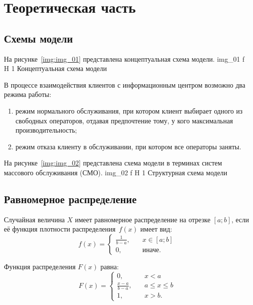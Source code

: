 \chapter{Теоретическая часть}

\section{Схемы модели}

На рисунке~\ref{img:img_01} представлена концептуальная схема модели.
	{img_01}
	{f}
	{H}
	{1\textwidth}
	{Концептуальная схема модели}

В процессе взаимодействия клиентов с информационным центром возможно два режима работы:
\begin{enumerate}
	\item режим нормального обслуживания, при котором клиент выбирает одного из свободных операторов, отдавая предпочтение тому, у кого максимальная производительность;
	\item режим отказа клиенту в обслуживании, при котором все операторы заняты.
\end{enumerate}

\clearpage

На рисунке~\ref{img:img_02} представлена схема модели в терминах систем массового обслуживания (СМО).
	{img_02}
	{f}
	{H}
	{1\textwidth}
	{Структурная схема модели}

\section{Равномерное распределение}

Случайная величина $X$ имеет равномерное распределение на отрезке $[a; b]$, если её функция плотности распределения~$f(x)$ имеет вид:
\begin{equation}
	f(x) =
	\begin{cases}
		\frac{1}{b - a}, & \quad x \in [a; b]\\
		0,  & \quad \text{иначе}.
	\end{cases}
\end{equation}

Функция распределения $F(x)$ равна:
\begin{equation}
	F(x) =
	\begin{cases}
		0, & \quad x < a \\
		\frac{x - a}{b - a}, & \quad a \le x \le b \\
		1,  & \quad x > b.
	\end{cases}
\end{equation}

